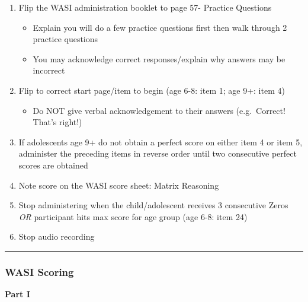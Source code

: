 \documentclass[]{book}
\providecommand{\tightlist}{%
  \setlength{\itemsep}{0pt}\setlength{\parskip}{0pt}}
\begin{document}
\begin{enumerate}
\def\labelenumi{\arabic{enumi}.}
\tightlist
\item
  Flip the WASI administration booklet to page 57- Practice Questions

  \begin{itemize}
  \tightlist
  \item
    Explain you will do a few practice questions first then walk through 2 practice questions
  \item
    You may acknowledge correct responses/explain why answers may be incorrect
  \end{itemize}
\item
  Flip to correct start page/item to begin (age 6-8: item 1; age 9+: item 4)

  \begin{itemize}
  \tightlist
  \item
    Do NOT give verbal acknowledgement to their answers (e.g.~Correct! That's right!)
  \end{itemize}
\item
  If adolescents age 9+ do not obtain a perfect score on either item 4 or item 5, administer the preceding items in reverse order until two consecutive perfect scores are obtained
\item
  Note score on the WASI score sheet: Matrix Reasoning
\item
  Stop administering when the child/adolescent receives 3 consecutive Zeros \emph{OR} participant hits max score for age group (age 6-8: item 24)
\item
  Stop audio recording
\end{enumerate}

\begin{center}\rule{0.5\linewidth}{0.5pt}\end{center}

\hypertarget{wasi-scoring}{%
\subsubsection{WASI Scoring}\label{wasi-scoring}}

\textbf{Part I}
\end{document}
